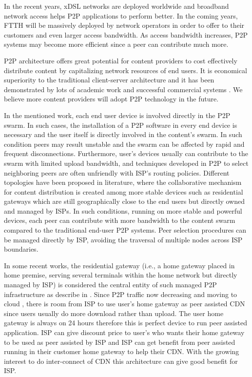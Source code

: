 \documentclass[paper]{ieice}
\begin{document}
In the recent years, xDSL networks are deployed worldwide and broadband network access helps P2P applications to perform better.
In the coming years, FTTH will be massively deployed by network operators in order to offer to their customers and even larger access bandwidth.
As access bandwidth increases, P2P systems may become more efficient since a peer can contribute much more. 

P2P architecture offers great potential for content providers to cost effectively distribute content by capitalizing network resources of end users.
It is economical superiority to the traditional client-server architecture and it has been demonstrated by lots of academic work and successful commercial systems \cite{Yin:2009:DDH:1631272.1631279}.
We believe more content providers will adopt P2P technology in the future. 

In the mentioned work, each end user device is involved directly in the P2P swarm.
In such cases, the installation of a P2P software in every end device is necessary and the user itself is directly involved in the content's swarm.
In such condition peers may result unstable and the swarm can be affected by rapid and frequent disconnections.
Furthermore, user's devices usually can contribute to the swarm with limited upload bandwidth, and techniques developed in P2P to select neighboring peers are often unfriendly with ISP's routing policies.
Different topologies have been proposed in literature, where the collaborative mechanism for content distribution is created among more stable devices such as residential gateways which are still geographically close to the end users but directly owned and managed by ISPs. 
In such conditions, running on more stable and powerful devices, each peer can contribute with more bandwidth to the content swarm compared to the traditional end-user P2P systems. 
Peer selection procedures can be managed directly by ISP, avoiding the traversal of multiple nodes across ISP boundaries.

In some recent works, the residential gateway (i.e., a home gateway placed in home premise, serving several terminals within the home network but directly managed by ISP) is considered the central entity of such managed P2P infrastructure as describe in \cite{Misra:2010:IPS:1811099.1811064,Cha:2008:NTP:1855641.1855646}.
Since P2P traffic now decreasing and moving to cloud \cite{Labovitz:2010:IIT:2043164.1851194}, there is room from ISP to use user's home gateway as peer assisted CDN since users usually do more download rather than upload.
The user home gateway is always on 24 hours therefore this is perfect device to run peer assisted application.
ISP can give discount price to user's who wants their home gateway to be used as peer assisted by ISP and ISP can get benefit from peer assisted running in their customer home gateway to help their CDN.
With the growing interest to do inter-connect of CDN \cite{cdni,oceanproject} this architecture can give good benefit for ISP.    
\end{document}

